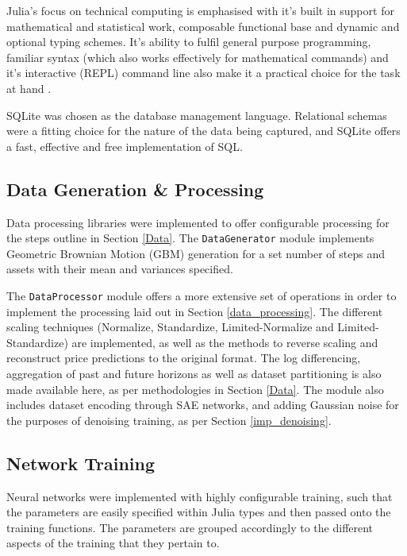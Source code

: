 \documentclass[a4paper,11pt,oneside]{article}
\theoremstyle{plain}
\theoremstyle{definition}
\begin{document}
	Julia's focus on technical computing is emphasised with it's built in support for mathematical and statistical work, composable functional base and dynamic and optional typing schemes. It's ability to fulfil general purpose programming, familiar syntax (which also works effectively for mathematical commands) and it's interactive (REPL) command line also make it a practical choice for the task at hand \citep{Perkel}.\newline
	
	SQLite was chosen as the database management language. Relational schemas were a fitting choice for the nature of the data being captured, and SQLite offers a fast, effective and free implementation of SQL.\newline
	
	
	\subsection{Data Generation \& Processing}
	
	Data processing libraries were implemented to offer configurable processing for the steps outline in Section \ref{Data}. The \texttt{DataGenerator} module \citep{DCDataGenerator} implements Geometric Brownian Motion (GBM) generation for a set number of steps and assets with their mean and variances specified. \newline
	
	The \texttt{DataProcessor} module \citep{DCDataProcessor} offers a more extensive set of operations in order to implement the processing laid out in Section \ref{data_processing}. The different scaling techniques (Normalize, Standardize, Limited-Normalize and Limited-Standardize) are implemented, as well as the methods to reverse scaling and reconstruct price predictions to the original format. The log differencing, aggregation of past and future horizons as well as dataset partitioning is also made available here, as per methodologies in Section \ref{Data}. The module also includes dataset encoding through SAE networks, and adding Gaussian noise for the purposes of denoising training, as per Section \ref{imp_denoising}.
	
	
	\subsection{Network Training}
	
	Neural networks were implemented with highly configurable training, such that the parameters are easily specified within Julia types \citep{DCTrainingStructures} and then passed onto the training functions. The parameters are grouped accordingly to the different aspects of the training that they pertain to. \newline
	
\end{document}
